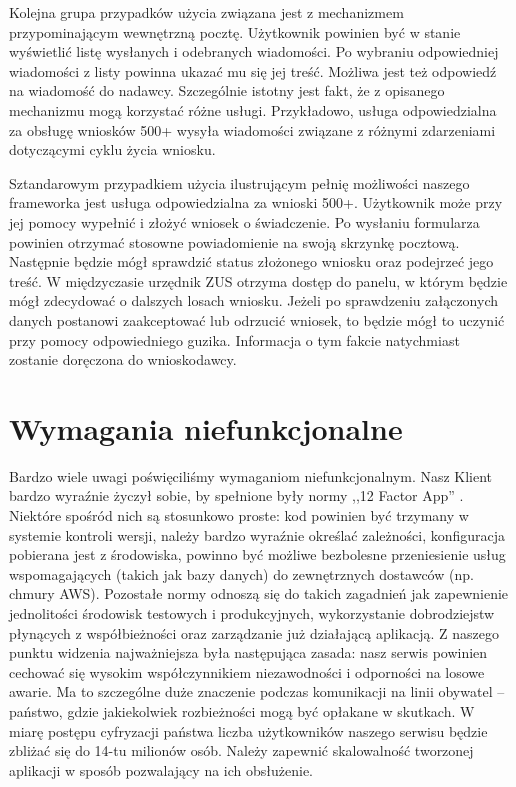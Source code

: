 \documentclass[licencjacka]{pracamgr}
\begin{document}
Kolejna grupa przypadków użycia związana jest z mechanizmem przypominającym
wewnętrzną pocztę. Użytkownik powinien być w stanie wyświetlić listę wysłanych
i odebranych wiadomości. Po wybraniu odpowiedniej wiadomości z listy powinna
ukazać mu się jej treść. Możliwa jest też odpowiedź na wiadomość do nadawcy.
Szczególnie istotny jest fakt, że z opisanego mechanizmu mogą korzystać różne
usługi. Przykładowo, usługa odpowiedzialna za obsługę wniosków 500+ wysyła
wiadomości związane z różnymi zdarzeniami dotyczącymi cyklu życia wniosku.

Sztandarowym przypadkiem użycia ilustrującym pełnię możliwości naszego frameworka
jest usługa odpowiedzialna za wnioski 500+. Użytkownik może przy jej pomocy
wypełnić i złożyć wniosek o świadczenie. Po wysłaniu formularza powinien otrzymać
stosowne powiadomienie na swoją skrzynkę pocztową. Następnie będzie mógł sprawdzić
status złożonego wniosku oraz podejrzeć jego treść. W międzyczasie urzędnik ZUS
otrzyma dostęp do panelu, w którym będzie mógł zdecydować o dalszych losach
wniosku. Jeżeli po sprawdzeniu załączonych danych postanowi zaakceptować lub
odrzucić wniosek, to będzie mógł to uczynić przy pomocy odpowiedniego guzika.
Informacja o tym fakcie natychmiast zostanie doręczona do wnioskodawcy.

\section{Wymagania niefunkcjonalne}

Bardzo wiele uwagi poświęciliśmy wymaganiom niefunkcjonalnym. Nasz Klient bardzo
wyraźnie życzył sobie, by spełnione były normy ,,12 Factor App'' \cite{tfa}.
Niektóre spośród nich są stosunkowo proste: kod powinien być trzymany w systemie
kontroli wersji, należy bardzo wyraźnie określać zależności, konfiguracja pobierana
jest z środowiska, powinno być możliwe bezbolesne przeniesienie usług wspomagających
(takich jak bazy danych) do zewnętrznych dostawców (np. chmury AWS). Pozostałe
normy odnoszą się do takich zagadnień jak zapewnienie jednolitości środowisk testowych
i produkcyjnych, wykorzystanie dobrodziejstw płynących z współbieżności oraz
zarządzanie już działającą aplikacją. Z naszego punktu widzenia najważniejsza była
następująca zasada: nasz serwis powinien cechować się wysokim współczynnikiem
niezawodności i odporności na losowe awarie. Ma to szczególne duże znaczenie
podczas komunikacji na linii obywatel -- państwo, gdzie jakiekolwiek rozbieżności
mogą być opłakane w skutkach. W miarę postępu cyfryzacji państwa liczba użytkowników
naszego serwisu będzie zbliżać się do 14-tu milionów osób. Należy zapewnić
skalowalność tworzonej aplikacji w sposób pozwalający na ich obsłużenie.
\end{document}
